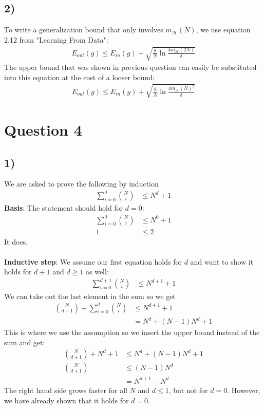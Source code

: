 \documentclass[a4paper]{article}
\begin{document}
\subsection*{2)}
To write a generalization bound that only involves $m_{\mathcal{H}}(N)$, we use equation 2.12 from "Learning From Data":
\begin{align*}
E_{out}(g)\leq E_{in}(g)+\sqrt{\frac{8}{N}\ln \frac{4m_{\mathcal{H}}(2N)}{\delta}}
\end{align*}
The upper bound that was shown in previous question can easily be substituted into this equation at the cost of a looser bound:
\begin{align*}
E_{out}(g)\leq E_{in}(g)+\sqrt{\frac{8}{N}\ln \frac{4m_{\mathcal{H}}(N)^2}{\delta}}
\end{align*}

\newpage
\section*{Question 4}
\subsection*{1)}
We are asked to prove the following by induction
\begin{align*}
\sum_{i=0}^d\binom{N}{i}&\leq N^d+1
\end{align*}
\textbf{Basis}: The statement should hold for $d=0$:
\begin{align*}
\sum_{i=0}^0\binom{N}{i}&\leq N^0+1 \\
1&\leq 2
\end{align*}
It does.\\
\\
\textbf{Inductive step}: We assume our first equation holds for $d$ and want to show it holds for $d+1$ and $d\geq 1$ as well:\\
\begin{align*}
\sum_{i=0}^{d+1}\binom{N}{i}&\leq N^{d+1}+1
\end{align*}
We can take out the last element in the sum so we get
\begin{align*}
\binom{N}{d+1}+\sum_{i=0}^{d}\binom{N}{i}&\leq N^{d+1}+1 \\
&=N^d+(N-1)N^d+1
\end{align*}
This is where we use the assumption so we insert the upper bound instead of the sum and get:
\begin{align*}
\binom{N}{d+1}+N^d+1&\leq N^d+(N-1)N^d+1 \\
\binom{N}{d+1}&\leq (N-1)N^d \\
&=N^{d+1}-N^d
\end{align*}
The right hand side grows faster for all $N$ and $d\leq 1$, but not for $d=0$. However, we have already shown that it holds for $d=0$.
\end{document}
